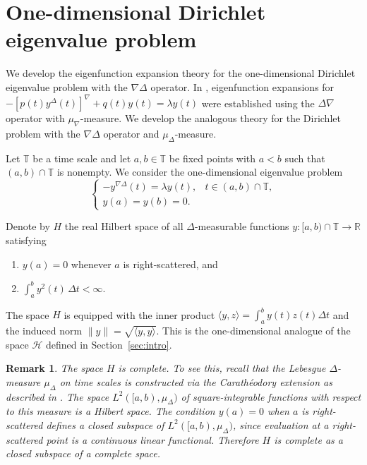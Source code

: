 \documentclass{article}
\newtheorem{remark}[theorem]{Remark}
\numberwithin{equation}{section}
\numberwithin{theorem}{section}
\begin{document}
\section{One-dimensional Dirichlet eigenvalue problem}\label{sec:1D}

We develop the eigenfunction expansion theory for the one-dimensional Dirichlet eigenvalue problem with the $\nabla\Delta$ operator. In \cite{Guseinov-EF}, eigenfunction expansions for $-[p(t)y^\Delta(t)]^\nabla + q(t)y(t) = \lambda y(t)$ were established using the $\Delta\nabla$ operator with $\mu_\nabla$-measure. We develop the analogous theory for the Dirichlet problem with the $\nabla\Delta$ operator and $\mu_\Delta$-measure.

Let $\mathbb{T}$ be a time scale and let $a, b \in \mathbb{T}$ be fixed points with $a < b$ such that $(a,b)\cap\mathbb{T}$ is nonempty. We consider the one-dimensional eigenvalue problem
\begin{equation}\label{eq:1D-evp}
\begin{cases}
-y^{\nabla\Delta}(t) = \lambda y(t), & t \in (a,b)\cap\mathbb{T},\\
y(a) = y(b) = 0.
\end{cases}
\end{equation}

Denote by $H$ the real Hilbert space of all $\Delta$-measurable functions $y\colon [a,b)\cap\mathbb{T} \to \mathbb{R}$ satisfying
\begin{enumerate}
\item[(i)] $y(a) = 0$ whenever $a$ is right-scattered, and
\item[(ii)] $\displaystyle\int_a^b y^2(t) \, \Delta t < \infty$.
\end{enumerate}
The space $H$ is equipped with the inner product $\langle y, z \rangle = \displaystyle\int_a^b y(t) z(t) \Delta t$
and the induced norm $\|y\| = \sqrt{\langle y, y \rangle}$. This is the one-dimensional analogue of the space $\mathscr{H}$ defined in Section~\ref{sec:intro}. 

\begin{remark} \label{rem:H-completeness}
The space $H$ is complete. To see this, recall that the Lebesgue $\Delta$-measure $\mu_\Delta$ on time scales is constructed via the Carath\'eodory extension as described in \cite{Bohner-Guseinov-Lebesgue}. The space $L^2([a,b), \mu_\Delta)$ of square-integrable functions with respect to this measure is a Hilbert space. The condition $y(a) = 0$ when $a$ is right-scattered defines a closed subspace of $L^2([a,b), \mu_\Delta)$, since evaluation at a right-scattered point is a continuous linear functional. Therefore $H$ is complete as a closed subspace of a complete space.
\end{remark}
\end{document}
